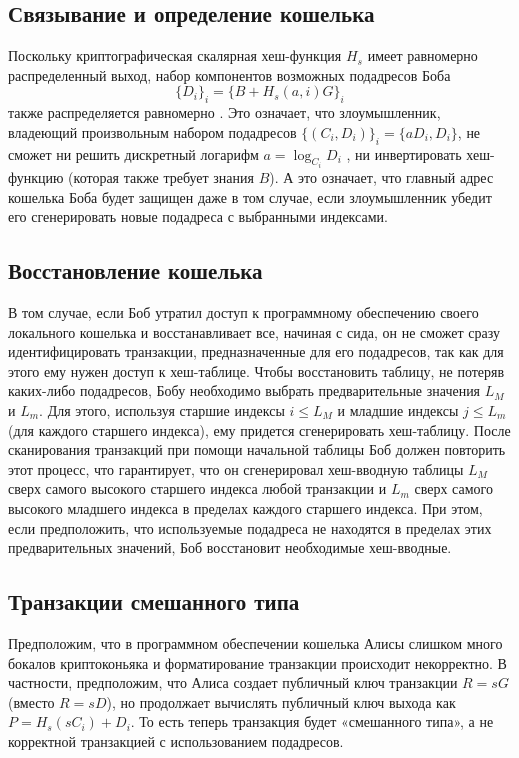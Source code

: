 \documentclass{mrl}
\begin{document}
\subsection{Связывание и определение кошелька}
Поскольку криптографическая скалярная хеш-функция $H_s$ имеет равномерно распределенный выход, набор компонентов возможных подадресов Боба $$\{D_i\}_i = \{B + H_s(a,i)G\}_i$$ также распределяется равномерно \cite{uniform}. Это означает, что злоумышленник, владеющий произвольным набором подадресов $\{(C_i,D_i)\}_i = \{aD_i,D_i\}$, не сможет ни решить дискретный логарифм $a = \log_{C_i} D_i$ , ни инвертировать хеш-функцию (которая также требует знания $B$). А это означает, что главный адрес кошелька Боба будет защищен даже в том случае, если злоумышленник убедит его сгенерировать новые подадреса с выбранными индексами.

\subsection{Восстановление кошелька}
В том случае, если Боб утратил доступ к программному обеспечению своего локального кошелька и восстанавливает все, начиная с сида, он не сможет сразу идентифицировать транзакции, предназначенные для его подадресов, так как для этого ему нужен доступ к хеш-таблице. Чтобы восстановить таблицу, не потеряв каких-либо подадресов, Бобу необходимо выбрать предварительные значения $L_M$ и $L_m$. Для этого, используя старшие индексы $i \leq L_M$ и младшие индексы $j \leq L_m$(для каждого старшего индекса), ему придется сгенерировать хеш-таблицу. После сканирования транзакций при помощи начальной таблицы Боб должен повторить этот процесс, что гарантирует, что он сгенерировал хеш-вводную таблицы $L_M$ сверх самого высокого старшего индекса любой транзакции и $L_m$ сверх самого высокого младшего индекса в пределах каждого старшего индекса. При этом, если предположить, что используемые подадреса не находятся в пределах этих предварительных значений, Боб восстановит необходимые хеш-вводные.

\subsection{Транзакции смешанного типа}
Предположим, что в программном обеспечении кошелька Алисы слишком много бокалов криптоконьяка и форматирование транзакции происходит некорректно. В частности, предположим, что Алиса создает публичный ключ транзакции $R = sG$ (вместо $R = sD$), но продолжает вычислять публичный ключ выхода как $P = H_s(sC_i) + D_i$. То есть теперь транзакция будет «смешанного типа», а не корректной транзакцией с использованием подадресов.
\end{document}
